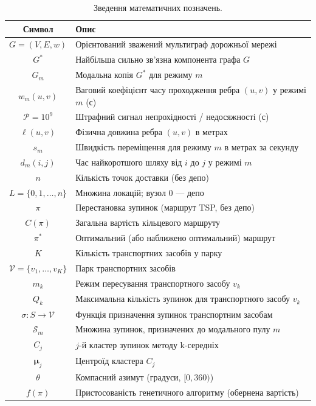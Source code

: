 \documentclass[12pt, a4paper]{article}
\theoremstyle{definition}
\begin{document}
\begin{table}[h]
  \centering
  \caption{Зведення математичних позначень.}
  \begin{tabular}{cl}
    \toprule
    Символ & Опис \\
    \midrule
    $G = (V, E, w)$ & Орієнтований зважений мультиграф дорожньої мережі \\
    $G^*$ & Найбільша сильно зв'язна компонента графа $G$ \\
    $G_m$ & Модальна копія $G^*$ для режиму $m$ \\
    $w_m(u, v)$ & Ваговий коефіцієнт часу проходження ребра $(u, v)$ у режимі $m$ (с) \\
    $\mathcal{P} = 10^9$ & Штрафний сигнал непрохідності / недосяжності (с) \\
    $\ell(u, v)$ & Фізична довжина ребра $(u, v)$ в метрах \\
    $s_m$ & Швидкість переміщення для режиму $m$ в метрах за секунду \\
    $d_m(i, j)$ & Час найкоротшого шляху від $i$ до $j$ у режимі $m$ \\
    $n$ & Кількість точок доставки (без депо) \\
    $L = \{0, 1, \ldots, n\}$ & Множина локацій; вузол $0$ --- депо \\
    $\pi$ & Перестановка зупинок (маршрут TSP, без депо) \\
    $C(\pi)$ & Загальна вартість кільцевого маршруту \\
    $\pi^*$ & Оптимальний (або наближено оптимальний) маршрут \\
    $K$ & Кількість транспортних засобів у парку \\
    $\mathcal{V} = \{v_1, \ldots, v_K\}$ & Парк транспортних засобів \\
    $m_k$ & Режим пересування транспортного засобу $v_k$ \\
    $Q_k$ & Максимальна кількість зупинок для транспортного засобу $v_k$ \\
    $\sigma : S \to \mathcal{V}$ & Функція призначення зупинок транспортним засобам \\
    $\mathcal{S}_m$ & Множина зупинок, призначених до модального пулу $m$ \\
    $C_j$ & $j$-й кластер зупинок методу k-середніх \\
    $\boldsymbol{\mu}_j$ & Центроїд кластера $C_j$ \\
    $\theta$ & Компасний азимут (градуси, $[0, 360)$) \\
    $f(\pi)$ & Пристосованість генетичного алгоритму (обернена вартість) \\
    \bottomrule
  \end{tabular}
\end{table}
\end{document}
